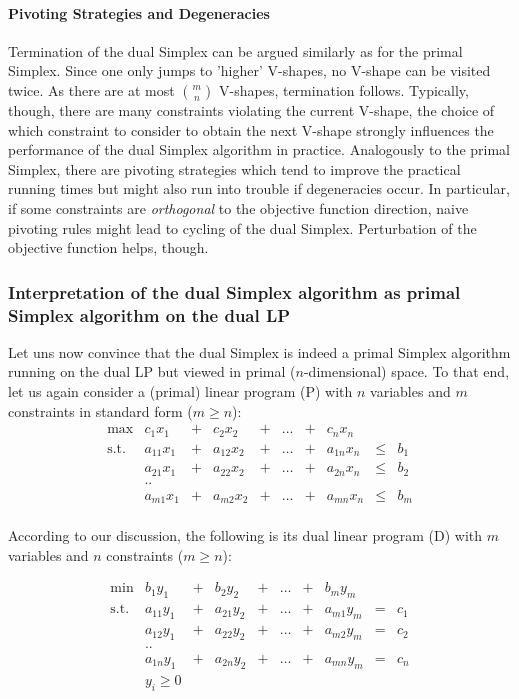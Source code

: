 \documentclass{article}
\begin{document}
\paragraph{Pivoting Strategies and Degeneracies}
Termination of the dual Simplex can be argued similarly as for the primal Simplex. Since one only jumps to 'higher' V-shapes, no V-shape can be visited twice. As there are at most $m \choose n$ V-shapes, termination follows. Typically, though, there are many constraints violating the current V-shape, the choice of which constraint to consider to obtain the next V-shape strongly influences the performance of the dual Simplex algorithm in practice. Analogously to the primal Simplex, there are pivoting strategies which tend to improve the practical running times but might also run into trouble if degeneracies occur. In particular, if some constraints are \emph{orthogonal} to the objective function direction, naive pivoting rules might lead to cycling of the dual Simplex. Perturbation of the objective function helps, though.

\subsubsection{Interpretation of the dual Simplex algorithm as primal Simplex algorithm on the dual LP}
Let uns now convince that the dual Simplex is indeed a primal Simplex algorithm running on the dual LP but viewed in primal ($n$-dimensional) space. To that end, let us again consider a (primal) linear program (P) with $n$ variables and $m$ constraints in standard form ($m\geq n$): 	
\[
\begin{matrix}
	\max	& c_1 x_1 &+& c_2 x_2 &+& \dots &+& c_n x_n&&\\  
	\mbox{s.t.}	& a_{11} x_1 &+& a_{12} x_2&+& \dots &+&a_{1n} x_n&\leq&b_1\\
			& a_{21} x_1 &+& a_{22} x_2&+& \dots &+&a_{2n} x_n&\leq&b_2\\
			& ..	&&&&&&&&\\
			& a_{m1} x_1 &+& a_{m2} x_2&+& \dots &+&a_{mn} x_n&\leq&b_m\\
\end{matrix}
\]

According to our discussion, the following is its dual linear program (D) with $m$ variables and $n$ constraints ($m\geq n$): 

\[
\begin{matrix}
	\min& b_1 y_1 &+& b_2 y_2 &+& \dots &+& b_m y_m&&\\  
	\mbox{s.t.}	& a_{11} y_1 &+& a_{21} y_2&+& \dots &+&a_{m1} y_m&=&c_1\\
			& a_{12} y_1 &+& a_{22} y_2&+& \dots &+&a_{m2} y_m&=&c_2\\
			& ..	&&&&&&&&\\
			& a_{1n} y_1 &+& a_{2n} y_2&+& \dots &+&a_{mn} y_m&=&c_n\\
			& y_i\geq 0\\
\end{matrix}
\]
\end{document}
